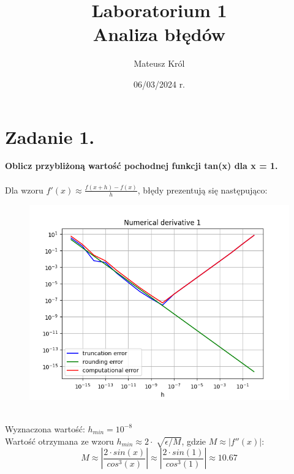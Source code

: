 \documentclass{article}
\title{%
Laboratorium 1\\
  \huge Analiza błędów}
\author{Mateusz Król}
\date{06/03/2024 r.}
\begin{document}
\maketitle


\section*{Zadanie 1.}
\textbf{Oblicz przybliżoną wartość pochodnej funkcji tan(x) dla x = 1.} 
\\\\
Dla wzoru $f'(x)\approx\frac{f(x+h)-f(x)}{h}$, błędy prezentują się następująco:
\begin{figure}[ht!]
\includegraphics[width=\linewidth]{figures/numerical_derivative_1.png}
\end{figure}
\\
Wyznaczona wartość: $h_{min} = 10^{-8}$ \\
Wartość otrzymana ze wzoru $h_{min} \approx 2\cdot\sqrt[]{\epsilon/M}$,
gdzie $M \approx \left|f''(x)\right|$: \\
$$M\approx \left|\frac{2 \cdot sin(x)}{cos^{3}(x)}\right|
\approx \left|\frac{2 \cdot sin(1)}{cos^{3}(1)}\right|
\approx 10.67$$
\end{document}
